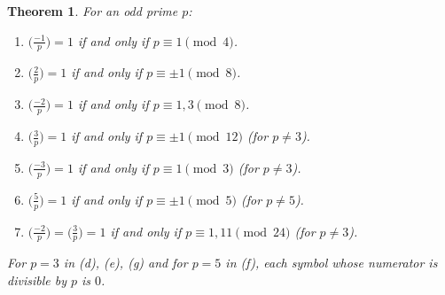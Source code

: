 \documentclass[11pt]{article}
\theoremstyle{ntstyle}
\newtheorem{theorem}{Theorem}[subsection]
\newcommand{\legs}[2]{\bigl(\tfrac{#1}{#2}\bigr)}
\begin{document}
\begin{theorem}\label{thm:7.5.2} For an odd prime $p$:

  \begin{enumerate}[label={\alph*)}]
    \item $\legs{-1}{p} = 1$ if and only if $p \equiv 1 \pmod{4}$.
    \item $\legs{2}{p} = 1$ if and only if $p \equiv \pm 1 \pmod{8}$.
    \item $\legs{-2}{p} = 1$ if and only if $p \equiv 1, 3 \pmod{8}$.
    \item $\legs{3}{p} = 1$ if and only if $p \equiv \pm 1 \pmod{12}$ (for $p \neq 3$).
    \item $\legs{-3}{p} = 1$ if and only if $p \equiv 1 \pmod{3}$
          (for $p \neq 3$).
    \item $\legs{5}{p} = 1$ if and only if $p \equiv \pm 1 \pmod{5}$ (for $p \neq 5$).
    \item $\legs{-2}{p} = \legs{3}{p} = 1$
            if and only if $p \equiv 1, 11 \pmod{24}$ (for $p \neq 3$).
  \end{enumerate}

  For $p = 3$ in (d), (e), (g) and for $p = 5$ in (f), each symbol whose
  numerator is divisible by $p$ is $0$.

\end{theorem}
\end{document}
